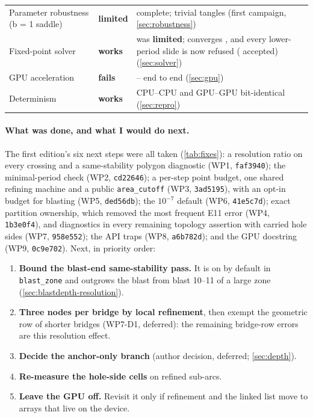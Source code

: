 \documentclass[11pt,a4paper]{article}
\newcommand{\works}{\textcolor{okgreen}{\textbf{works}}}
\newcommand{\limited}{\textcolor{limamber}{\textbf{limited}}}
\newcommand{\fails}{\textcolor{failred}{\textbf{fails}}}
\newcommand{\code}[1]{\texttt{#1}}
\begin{document}
\begin{table}[H]
\begin{tabularx}{\textwidth}{@{}l l Y@{}}
Parameter robustness (b = 1 saddle) & \limited & \NumSaddleSuccessFraction{} complete; \NumSweepZeroCrossings{} trivial tangles (first campaign, \cref{sec:robustness}) \\
Fixed-point solver & \works & was \limited; converges \NumSolverConvergedRate{}, and every lower-period slide is now refused (\NumSolverLowerAccepted{} accepted) (\cref{sec:solver}) \\
GPU acceleration & \fails & \NumGpuTotalSpeedupMedianKTen{}--\NumGpuTotalSpeedupMedianKTwoEight{} end to end (\cref{sec:gpu}) \\
Determinism & \works & CPU--CPU and GPU--GPU bit-identical (\cref{sec:repro}) \\
\bottomrule
\end{tabularx}
\end{table}

\paragraph{What was done, and what I would do next.} The first edition's
six next steps were all taken (\cref{tab:fixes}): a resolution ratio on
every crossing and a same-stability polygon diagnostic (WP1,
\code{faf3940}); the minimal-period check (WP2, \code{cd22646}); a per-step
point budget, one shared refining machine and a public \code{area\_cutoff}
(WP3, \code{3ad5195}), with an opt-in budget for blasting (WP5,
\code{ded56db}); the $10^{-7}$ default (WP6, \code{41e5c7d}); exact
partition ownership, which removed the most frequent E11 error (WP4,
\code{1b3e0f4}), and diagnostics in every remaining topology assertion with
carried hole sides (WP7, \code{958e552}); the API traps (WP8,
\code{a6b782d}); and the GPU docstring (WP9, \code{0c9e702}). Next, in
priority order:
\begin{enumerate}[leftmargin=*]
\item \textbf{Bound the blast-end same-stability pass.} It is on by default
  in \code{blast\_zone} and outgrows the blast from blast 10--11 of a large
  zone (\cref{sec:blastdepth-resolution}).
\item \textbf{Three nodes per bridge by local refinement}, then exempt the
  geometric row of shorter bridges (WP7-D1, deferred): the remaining
  bridge-row errors are this resolution effect.
\item \textbf{Decide the anchor-only branch} (author decision, deferred;
  \cref{sec:depth}).
\item \textbf{Re-measure the hole-side cells} on refined sub-arcs.
\item \textbf{Leave the GPU off.} Revisit it only if refinement and the
  linked list move to arrays that live on the device.
\end{enumerate}
\end{document}
